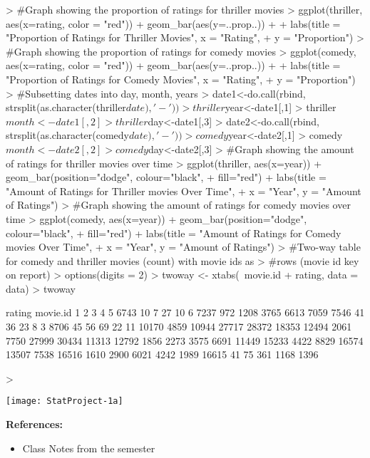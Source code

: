 \documentclass[12pt]{article}
\begin{document}
\begin{Schunk}
\begin{Sinput}
> #Graph showing the proportion of ratings for thriller movies
> ggplot(thriller, aes(x=rating, color = "red")) + geom_bar(aes(y=..prop..)) + 
+   labs(title = "Proportion of Ratings for Thriller Movies", x = "Rating", 
+        y = "Proportion")
> #Graph showing the proportion of ratings for comedy movies
> ggplot(comedy, aes(x=rating, color = "red")) + geom_bar(aes(y=..prop..)) + 
+   labs(title = "Proportion of Ratings for Comedy Movies", x = "Rating", 
+        y = "Proportion")
> #Subsetting dates into day, month, years
> date1<-do.call(rbind, strsplit(as.character(thriller$date), '-'))
> thriller$year<-date1[,1]
> thriller$month<-date1[,2]
> thriller$day<-date1[,3]
> date2<-do.call(rbind, strsplit(as.character(comedy$date), '-'))
> comedy$year<-date2[,1]
> comedy$month<-date2[,2]
> comedy$day<-date2[,3]
> #Graph showing the amount of ratings for thriller movies over time
> ggplot(thriller, aes(x=year)) + geom_bar(position="dodge", colour="black",
+ fill="red") + labs(title = "Amount of Ratings for Thriller movies Over Time",
+                    x = "Year", y = "Amount of Ratings") 
> #Graph showing the amount of ratings for comedy movies over time
> ggplot(comedy, aes(x=year)) + geom_bar(position="dodge", colour="black",
+ fill="red") + labs(title = "Amount of Ratings for Comedy movies Over Time", 
+                    x = "Year", y = "Amount of Ratings") 
> #Two-way table for comedy and thriller movies (count) with movie ids as 
> #rows (movie id key on report)
> options(digits = 2)
> twoway <- xtabs(~movie.id + rating, data = data)
> twoway
\end{Sinput}
\begin{Soutput}
        rating
movie.id     1     2     3     4     5
   6743     10     7    27    10     6
   7237    972  1208  3765  6613  7059
   7546     41    36    23     8     3
   8706     45    56    69    22    11
   10170  4859 10944 27717 28372 18353
   12494  2061  7750 27999 30434 11313
   12792  1856  2273  3575  6691 11449
   15233  4422  8829 16574 13507  7538
   16516  1610  2900  6021  4242  1989
   16615    41    75   361  1168  1396
\end{Soutput}
\begin{Sinput}
> 
\end{Sinput}
\end{Schunk}
\texttt{[image: StatProject-1a]}


\vspace{12pt}
\noindent
\textbf{References:}
\begin{itemize}
\item Class Notes from the semester
\end{itemize}




\end{document}
